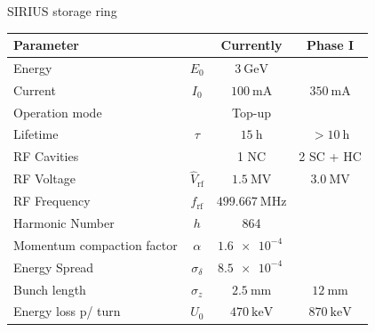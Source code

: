\documentclass[aspectratio=169]{beamer}
\begin{document}
\begin{frame}{SIRIUS storage ring}
\begin{minipage}{0.62\textwidth}
        \begin{tabular}{lccc}
                \toprule\toprule
                Parameter & & Currently & Phase I \\
                \toprule
                Energy  & $E_0$  & $\SI{3}{\giga\electronvolt}$ & \\
                Current & $I_0$ &  $\SI{100}{\milli\ampere}$ & $\SI{350}{\milli\ampere}$ \\
                Operation mode & & Top-up &      \\
                Lifetime & $\tau$ & $\SI{15}{\hour}$ & $>\SI{10}{\hour}$ \\
                RF Cavities & & 1 NC & 2 SC + HC \\
                RF Voltage & $\hat{V}_{\mathrm{rf}}$ &  $\SI{1.5}{\mega\volt}$ & $\SI{3.0}{\mega\volt}$\\
                RF Frequency &   $f_{\mathrm{rf}}$ &  $\SI{499.667}{\mega\hertz}$ &  \\
                Harmonic Number &   $h$ &  864 \\
                Momentum compaction factor & $\alpha$ &   $\SI{1.6e-4}{}$ & \\
                Energy Spread & $\sigma_\delta$ &  $\SI{8.5e-4}{}$ & \\
                Bunch length & $\sigma_z$ &  $\SI{2.5}{\milli\meter}$ & $\SI{12}{\milli\meter}$ \\
                Energy loss p/ turn  & $U_0$ &  $\SI{470}{\kilo\electronvolt}$ & $\SI{870}{\kilo\electronvolt}$ \\
                \bottomrule\bottomrule
        \end{tabular}
    \end{minipage}
\end{frame}
\end{document}
